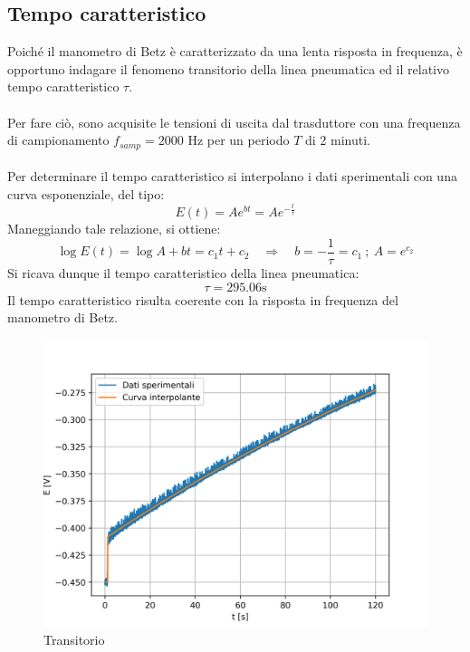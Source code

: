 \newpage
\subsection{Tempo caratteristico}
Poiché il manometro di Betz è caratterizzato da una lenta risposta in frequenza, è opportuno indagare il fenomeno transitorio della linea pneumatica ed il relativo tempo caratteristico $\tau$.\\\\
Per fare ciò, sono acquisite le tensioni di uscita dal trasduttore con una frequenza di campionamento $f_{samp}=2000$ Hz per un periodo $T$ di 2 minuti.\\\\
Per determinare il tempo caratteristico si interpolano i dati sperimentali con una curva esponenziale, del tipo:
\begin{equation*}
    E(t) = Ae^{bt} = Ae^{-\frac t\tau}
\end{equation*}
Maneggiando tale relazione, si ottiene:
\begin{equation*}
    \log E(t) = \log A + bt = c_1 t + c_2 \quad \Rightarrow \quad b = -\frac1\tau = c_1 \ ; \ A = e^{c_2}
\end{equation*}
Si ricava dunque il tempo caratteristico della linea pneumatica:
\begin{equation*}
    \tau = 295.06 \text{s}
\end{equation*}
Il tempo caratteristico risulta coerente con la risposta in frequenza del manometro di Betz.
\begin{figure}[h!]
    \centering
    \includegraphics[width=.9\textwidth]{images/1/transitorio.png}
    \caption{Transitorio}\label{fig:t1}
\end{figure}